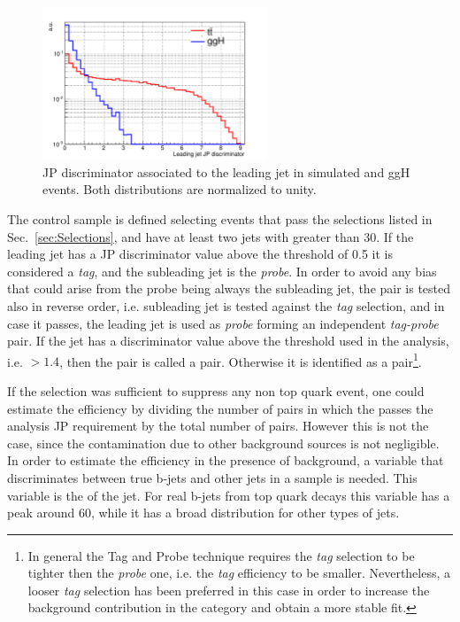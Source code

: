 \begin{figure}[htb]
\centering
\includegraphics[width=0.6\textwidth]{images/JPdiscr.pdf}
\caption{JP discriminator associated to the leading jet in simulated \ttbar and ggH events. Both distributions are normalized to unity.\label{fig:JPdiscr}}
\end{figure}

The control sample is defined selecting events that pass the selections listed in Sec.~\ref{sec:Selections}, and have at least two jets with \pt greater than 30\GeV. If the leading jet has a JP discriminator value above the threshold of 0.5 it is considered a \emph{tag}, and the subleading jet is the \emph{probe}. In order to avoid any bias that could arise from the probe being always the subleading jet, the pair is tested also in reverse order, i.e. subleading jet is tested against the \emph{tag} selection, and in case it passes, the leading jet is used as \emph{probe} forming an independent \emph{tag-probe} pair. If the \probe jet has a discriminator value above the threshold used in the analysis, i.e. $>1.4$, then the \tp pair is called a \tpp pair. Otherwise it is identified as a \tfp pair\footnote{In general the Tag and Probe technique requires the \emph{tag} selection to be tighter then the \emph{probe} one, i.e. the \emph{tag} efficiency to be smaller. Nevertheless, a looser \emph{tag} selection has been preferred in this case in order to increase the background contribution in the \tpp category and obtain a more stable fit.}.

If the \tg selection was sufficient to suppress any non top quark event, one could estimate the efficiency by dividing the number of \tp pairs in which the \probe passes the analysis JP requirement by the total number of \tp pairs. However this is not the case, since the contamination due to other background sources is not negligible. In order to estimate the efficiency in the presence of background, a variable that discriminates between true b-jets and other jets in a \ttbar sample is needed. This variable is the \pt of the \probe jet. For real b-jets from top quark decays this variable has a peak around 60\GeV, while it has a broad distribution for other types of jets.

